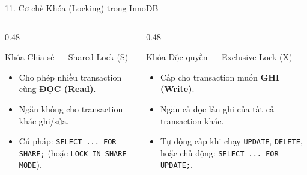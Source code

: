 \documentclass[aspectratio=169,11pt]{beamer}
\newcommand{\code}[1]{\texttt{#1}}
\begin{document}
\begin{frame}{11. Cơ chế Khóa (Locking) trong InnoDB}
  \begin{columns}[T]
    \begin{column}{0.48\textwidth}
      \begin{block}{Khóa Chia sẻ --- Shared Lock (S)}
        \begin{itemize}
          \item Cho phép nhiều transaction cùng \textbf{ĐỌC (Read)}.
          \item Ngăn không cho transaction khác ghi/sửa.
          \item Cú pháp: \code{SELECT ... FOR SHARE;} (hoặc \code{LOCK IN SHARE MODE}).
        \end{itemize}
      \end{block}
    \end{column}
    \begin{column}{0.48\textwidth}
      \begin{alertblock}{Khóa Độc quyền --- Exclusive Lock (X)}
        \begin{itemize}
          \item Cấp cho transaction muốn \textbf{GHI (Write)}.
          \item Ngăn cả đọc lẫn ghi của tất cả transaction khác.
          \item Tự động cấp khi chạy \code{UPDATE}, \code{DELETE}, hoặc chủ động: \code{SELECT ... FOR UPDATE;}.
        \end{itemize}
      \end{alertblock}
    \end{column}
  \end{columns}
\end{frame}
\end{document}
